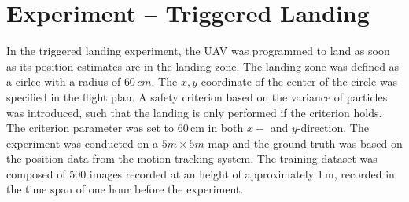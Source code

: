 \section{Experiment -- Triggered Landing}

In the triggered landing experiment, the UAV was programmed to land as soon as its position estimates are in the landing zone. The landing zone was defined as a cirlce with a radius of $60\,cm$. The $x,y$-coordinate of the center of the circle was specified in the flight plan. A safety criterion based on the variance of particles was introduced, such that the landing is only performed if the criterion holds. The criterion parameter was set to 60\,cm in both $x-$ and $y$-direction. The experiment was conducted on a $5m \times 5m$ map and the ground truth was based on the position data from the motion tracking system. The training dataset was composed of 500 images recorded at an height of approximately 1\,m, recorded in the time span of one hour before the experiment.   